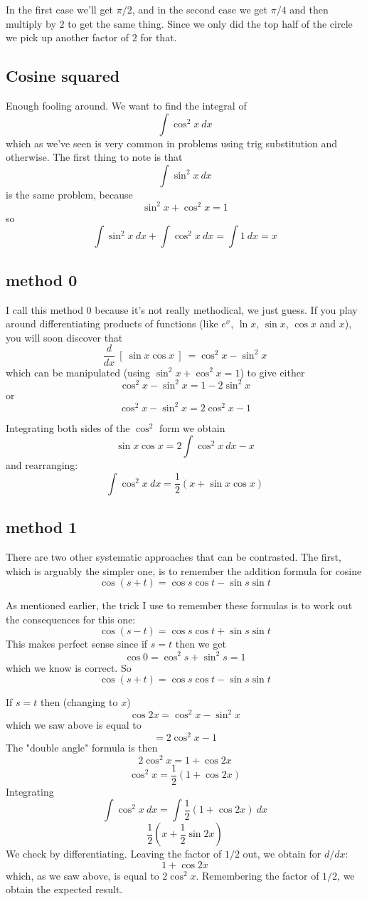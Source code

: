 \documentclass[11pt, oneside]{article}
\begin{document}
In the first case we'll get $\pi/2$, and in the second case we get $\pi/4$ and then multiply by $2$ to get the same thing.  Since we only did the top half of the circle we pick up another factor of $2$ for that.

\subsection*{Cosine squared}
Enough fooling around.  We want to find the integral of
\[ \int \cos^2 x \ dx \]
which as we've seen is very common in problems using trig substitution and otherwise.  The first thing to note is that 
\[ \int \sin^2 x \ dx \]
is the same problem, because
\[ \sin^2 x + \cos^2 x = 1 \]
so 
\[ \int \sin^2 x \ dx + \int \cos^2 x  \ dx = \int 1 \ dx = x \]

\subsection*{method 0}
I call this method 0 because it's not really methodical, we just guess.  If you play around differentiating products of functions (like $e^x$, $\ln x$, $\sin x$, $\cos x$ and $x$), you will soon discover that
\[ \frac{d}{dx} \ [ \ \sin x \cos x \ ] \ = \cos^2 x - \sin^2 x  \]
which can be manipulated (using $\sin^2 x + \cos^2 x = 1$) to give either
\[ \cos^2 x - \sin^2 x = 1- 2 \sin^2 x \]
or
\[ \cos^2 x - \sin^2 x = 2 \cos^2 x - 1 \]

Integrating both sides of the $\cos^2$ form we obtain
\[ \sin x \cos x = 2 \int \cos^2 x \ dx - x \]
and rearranging:
\[ \int \cos^2 x \ dx = \frac{1}{2} (x + \sin x \cos x) \]

\subsection*{method 1}
There are two other systematic approaches that can be contrasted.  The first, which is arguably the simpler one, is to remember the addition formula for cosine
\[ \cos (s+t) = \cos s \cos t - \sin s \sin t \]

As mentioned earlier, the trick I use to remember these formulas is to work out the consequences for this one:
\[ \cos (s-t) = \cos s \cos t + \sin s \sin t \]
This makes perfect sense since if $s=t$ then we get
\[ \cos 0 = \cos^2 s + \sin^2 s = 1 \]
which we know is correct.  So
\[ \cos (s+t) = \cos s \cos t - \sin s \sin t \]

If $s=t$ then (changing to $x$)
\[ \cos 2x = \cos^2 x  - \sin^2 x \]
which we saw above is equal to
\[ = 2\cos^2 x - 1 \]
The "double angle" formula is then
\[ 2 \cos^2 x = 1 + \cos 2 x \]
\[ \cos^2 x= \frac{1}{2} ( 1 + \cos 2x )  \]
Integrating
\[ \int \cos^2 x \ dx = \int \frac{1}{2} ( 1 + \cos 2x ) \ dx \]
\[ \frac{1}{2} ( x + \frac{1}{2} \sin 2x ) \]
We check by differentiating.  Leaving the factor of $1/2$ out, we obtain for $d/dx$:
\[ 1 + \cos 2x \]
which, as we saw above, is equal to $2 \cos^2 x$.  Remembering the factor of $1/2$, we obtain the expected result.
\end{document}
